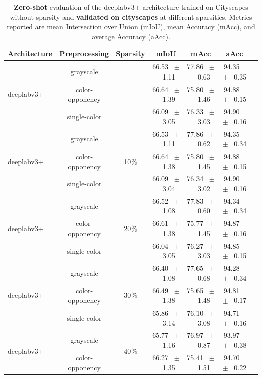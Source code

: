\begin{table}[h]
  \centering
  \caption{\textbf{Zero-shot} evaluation of the deeplabv3+ architecture trained on Cityscapes without sparsity and \textbf{validated on cityscapes} at different sparsities. Metrics reported are mean Intersection over Union (mIoU), mean Accuracy (mAcc), and average Accuracy (aAcc).}
  \begin{tabular}{@{}lccc ccc@{}}
    \toprule
    Architecture & Preprocessing & Sparsity & mIoU & mAcc & aAcc \\
    \midrule
    \multirow{3}{*}{deeplabv3+} & grayscale & \multirow{3}{*}{-} & 66.53 ~$\pm$~ 1.11 & 77.86 ~$\pm$~ 0.63 & 94.35 ~$\pm$~ 0.35 \\
    & color-opponency &  & 66.64 ~$\pm$~ 1.39 & 75.80 ~$\pm$~ 1.46 & 94.88 ~$\pm$~ 0.15 \\
    & single-color &  & 66.09 ~$\pm$~ 3.05 & 76.33 ~$\pm$~ 3.03 & 94.90 ~$\pm$~ 0.16 \\
    \midrule
    \multirow{3}{*}{deeplabv3+} & grayscale & \multirow{3}{*}{10\%} & 66.53 ~$\pm$~ 1.11 & 77.86 ~$\pm$~ 0.62 & 94.35 ~$\pm$~ 0.34 \\
    & color-opponency &  & 66.64 ~$\pm$~ 1.38 & 75.80 ~$\pm$~ 1.45 & 94.88 ~$\pm$~ 0.15 \\
    & single-color &  & 66.09 ~$\pm$~ 3.04 & 76.34 ~$\pm$~ 3.02 & 94.90 ~$\pm$~ 0.16 \\
    \midrule
    \multirow{3}{*}{deeplabv3+} & grayscale & \multirow{3}{*}{20\%} & 66.52 ~$\pm$~ 1.08 & 77.83 ~$\pm$~ 0.60 & 94.34 ~$\pm$~ 0.34 \\
    & color-opponency &  & 66.61 ~$\pm$~ 1.38 & 75.77 ~$\pm$~ 1.45 & 94.87 ~$\pm$~ 0.16 \\
    & single-color &  & 66.04 ~$\pm$~ 3.05 & 76.27 ~$\pm$~ 3.03 & 94.85 ~$\pm$~ 0.15 \\
    \midrule
    \multirow{3}{*}{deeplabv3+} & grayscale & \multirow{3}{*}{30\%} & 66.40 ~$\pm$~ 1.08 & 77.65 ~$\pm$~ 0.68 & 94.28 ~$\pm$~ 0.34 \\
    & color-opponency &  & 66.49 ~$\pm$~ 1.38 & 75.65 ~$\pm$~ 1.48 & 94.81 ~$\pm$~ 0.17 \\
    & single-color &  & 65.86 ~$\pm$~ 3.14 & 76.10 ~$\pm$~ 3.08 & 94.71 ~$\pm$~ 0.16 \\
    \midrule
    \multirow{3}{*}{deeplabv3+} & grayscale & \multirow{3}{*}{40\%} & 65.77 ~$\pm$~ 1.16 & 76.97 ~$\pm$~ 0.87 & 93.97 ~$\pm$~ 0.38 \\
    & color-opponency &  & 66.27 ~$\pm$~ 1.35 & 75.41 ~$\pm$~ 1.51 & 94.70 ~$\pm$~ 0.22 \\

\end{tabular}
\end{table}
